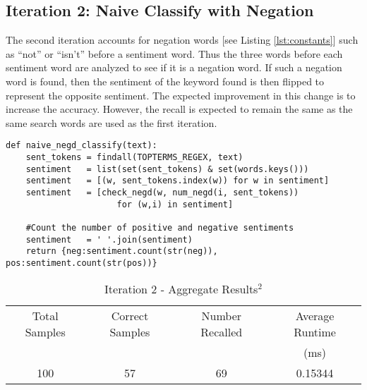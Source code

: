 \subsection{Iteration 2: Naive Classify with Negation} %
\label{sub:iteration_2_naive_classify_with_negation}
    The second iteration accounts for negation words [see Listing \ref{lst:constants}] such as ``not'' or ``isn't'' before a sentiment word.  Thus the three words before each sentiment word are analyzed to see if it is a negation word.  If such a negation word is found, then the sentiment of the keyword found is then flipped to represent the opposite sentiment.  The expected improvement in this change is to increase the accuracy. However, the recall is expected to remain the same as the same search words are used as the first iteration.\\
    
	\begin{lstlisting}[caption={\textit{utils.py}: code fragment for naive classify with negation}]
def naive_negd_classify(text):
    sent_tokens = findall(TOPTERMS_REGEX, text)
    sentiment   = list(set(sent_tokens) & set(words.keys()))
    sentiment   = [(w, sent_tokens.index(w)) for w in sentiment]
    sentiment   = [check_negd(w, num_negd(i, sent_tokens))
                      for (w,i) in sentiment]

    #Count the number of positive and negative sentiments
    sentiment   = ' '.join(sentiment)
    return {neg:sentiment.count(str(neg)), pos:sentiment.count(str(pos))}
	\end{lstlisting}
	
	\begin{table}[htp]
		\centering
		\caption{Iteration 2 - Aggregate Results$^2$}
		\begin{tabular}{cccc}
			\toprule
Total Samples	& Correct Samples	& Number Recalled   & Average Runtime\\
				&					&                   & (ms)\\
			\toprule
100             & 57                & 69                & 0.15344 \\
			\bottomrule
		\end{tabular}
		\label{tab:iter_2_aggregate_results}
	\end{table}

\newpage
